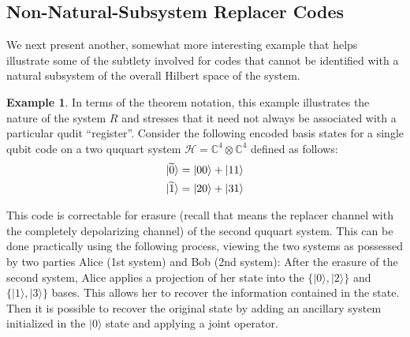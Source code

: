\documentclass[11pt]{amsart}
\theoremstyle{definition}
\newtheorem{example}[thm]{Example}
\theoremstyle{definition}
\theoremstyle{definition}
\newcommand{\1}{\mathbb{I}}
\def\ket#1{| #1 \rangle}
\begin{document}
\subsection{Non-Natural-Subsystem Replacer Codes}

We next present another, somewhat more interesting example that helps illustrate some of the subtlety involved for codes that cannot be identified with a natural subsystem of the overall Hilbert space of the system. 

\begin{example}\label{nondividingdimensioneg} 
In terms of the theorem notation, this example illustrates the nature of the system $R$ and stresses that it need not always be associated with a particular qudit ``register''. Consider the following encoded basis states for a single qubit code on a two ququart system $\mathcal H = \mathbb{C}^4 \otimes \mathbb{C}^4$ defined as follows:
    \begin{align}
        \ket{\widetilde{0}} = \ket{00}+\ket{11} \notag \\
        \ket{\widetilde{1}} = \ket{20}+\ket{31} \notag
    \end{align}
    
This code is correctable for erasure (recall that means the replacer channel with the completely depolarizing channel) of the second ququart system. This can be done practically using the following process, viewing the two systems as possessed by two parties Alice (1st system) and Bob (2nd system): After the erasure of the second system, Alice applies a projection of her state into the $\{\ket{0},\ket{2}\}$ and $\{\ket{1},\ket{3}\}$ bases. This allows her to recover the information contained in the state. Then it is possible to recover the original state by adding an ancillary system initialized in the $\ket{0}$ state and applying a joint operator. 


\end{example}
\end{document}
